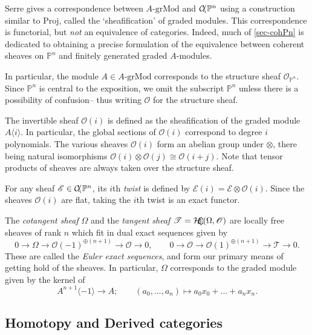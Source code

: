 \documentclass[a4paper]{article}
\theoremstyle{definition}
\theoremstyle{remark}
\newcommand{\grMod}{\ensuremath{\text{-grMod}}}
\DeclareMathOperator{\Homsh}{\mathcal{H\kern -3pt o\kern -2pt m\kern -1pt}}
\newcommand{\Proj}{\ensuremath{\text{Proj}}}
\newcommand{\Pn}{\ensuremath{{\mathbb{P}^n}}}
\DeclareMathOperator{\coh}{\mathcal{C\kern -2pt o\kern -2pt h\kern -1pt}}
\begin{document}
Serre gives a correspondence between \(A\grMod\) and
\(\coh\Pn\) using a construction similar to \(\Proj\), called the
`sheafification' of graded modules. This correspondence is functorial, but
\textit{not} an equivalence of categories. Indeed, much of \cref{sec-cohPn} is
dedicated to obtaining a precise formulation of the equivalence between coherent
sheaves on \(\Pn\) and finitely generated graded \(A\)-modules.

In particular, the module \(A\in A\grMod\) corresponds to the structure sheaf
\(\mathscr{O}_\Pn\). Since \(\Pn\) is central to the exposition, we omit the
subscript \(\Pn\) unless there is a possibility of confusion-- thus writing
\(\mathscr{O}\) for the structure sheaf.

The invertible sheaf \(\mathscr{O}(i)\) is defined as the sheafification of
the graded module \(A\langle i \rangle\). In particular, the global sections of
\(\mathscr{O}(i)\) correspond to degree \(i\) polynomials. The various sheaves
\(\mathscr{O}(i)\) form an abelian group under \(\otimes\), there being natural
isomorphisms \(\mathscr{O}(i)\otimes \mathscr{O}(j)\cong \mathscr{O}(i+j).\)
Note that tensor products of sheaves are always taken over the structure
sheaf. 

For any sheaf \({\mathscr{E}\in \coh\Pn}\), its \(i\)th \textit{twist} is defined by
\(\mathscr{E}(i)= \mathscr{E}\otimes \mathscr{O}(i).\) Since the sheaves
\(\mathscr{O}(i)\) are flat, taking the \(i\)th twist is an exact functor.

The \textit{cotangent sheaf} \(\Omega\) and the \textit{tangent sheaf}
\(\mathscr{T}=\Homsh(\Omega, \mathscr{O})\) are locally free sheaves of rank
\(n\) which fit in dual exact sequences given by
\begin{equation} \label{eulerexactsequence}
    0\rightarrow \Omega \rightarrow \mathscr{O}(-1)^{\oplus(n+1)} \rightarrow
    \mathscr{O}\rightarrow 0, \qquad
    0\rightarrow \mathscr{O}\rightarrow \mathscr{O}(1)^{\oplus(n+1)}\rightarrow
    \mathscr{T}\rightarrow 0.
\end{equation}
These are called the \textit{Euler exact sequences}, and form our primary means
of getting hold of the sheaves. In particular, \(\Omega\) corresponds to the
graded module given by the kernel of 
\[A^{n+1}\langle -1 \rangle\longrightarrow A; \qquad (a_0,...,a_n)\longmapsto
a_0x_0+...+a_nx_n.\]

\subsection{Homotopy and Derived categories}
\end{document}
